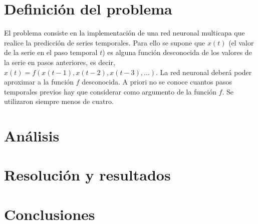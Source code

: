 \documentclass[a4paper,10pt]{article}
\begin{document}
\setcounter{page}{1}


\section{Definición del problema}

El problema consiste en la implementación de una red neuronal multicapa que realice la predicción de series temporales. Para ello se supone que $x(t)$ (el valor de la 
serie en el paso temporal $t$) es alguna función desconocida de los valores de la serie en pasos anteriores, es decir, $x(t) = f (x(t - 1), x(t - 2), x(t - 3), \dots)$. 
La red neuronal deberá poder aproximar a la función $f$ desconocida. A priori no se conoce cuantos pasos temporales previos hay que considerar como argumento 
de la función $f$. Se utilizaron siempre menos de cuatro.

\section{Análisis}


\section{Resolución y resultados}


\section{Conclusiones}




\end{document}
